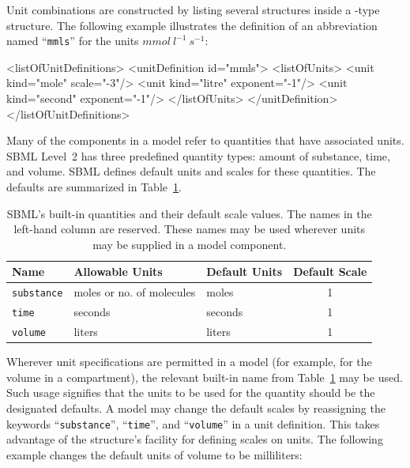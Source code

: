 \documentclass[10pt]{cekarticle}
\newcommand{\vref}[1]{\ref{#1}}
\begin{document}
Unit combinations are constructed by listing several 
structures inside a -type structure.  The following
example illustrates the definition of an abbreviation named
``\texttt{mmls}'' for the units $mmol\ l^{-1}\ s^{-1}$:

\begin{example}
<listOfUnitDefinitions>
    <unitDefinition id="mmls">
        <listOfUnits>
            <unit kind="mole"   scale="-3"/>
            <unit kind="litre"  exponent="-1"/>
            <unit kind="second" exponent="-1"/>
        </listOfUnits>
    </unitDefinition>
</listOfUnitDefinitions>
\end{example}

Many of the components in a model refer to quantities that have
associated units.  SBML Level~2 has three predefined quantity
types: amount of substance, time, and volume.  SBML defines
default units and scales for these quantities.  The defaults are
summarized in Table~\vref{tab:builtin}.

\begin{table}[htb]
  \vspace*{8pt}
  \centering
  \begin{tabular}{lllc}
    \toprule
    \textbf{Name} & \textbf{Allowable Units} & \textbf{Default Units} & \textbf{Default Scale} \\
    \midrule
    \texttt{substance} & moles or no. of molecules & moles            & 1 \\
    \texttt{time}      & seconds                   & seconds          & 1 \\
    \texttt{volume}    & liters                    & liters           & 1 \\
    \bottomrule
  \end{tabular}
  \caption{SBML's built-in quantities and their default
    scale values.  The names in the left-hand column are reserved. These
    names may be used wherever
    units may be supplied in a model component.}
  \label{tab:builtin}
\end{table}


Wherever unit specifications are permitted in a model (for example, for the
volume in a compartment), the relevant built-in name from
Table~\vref{tab:builtin} may be used.  Such usage signifies that the units
to be used for the quantity should be the designated defaults.  A model may
change the default scales by reassigning the keywords
``\texttt{substance}'', ``\texttt{time}'', and ``\texttt{volume}'' in a
unit definition.  This takes advantage of the 
structure's facility for defining scales on units.  The following example
changes the default units of volume to be milliliters:
\end{document}
